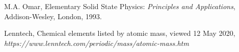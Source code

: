 \begin{thebibliography}{9}
    M.A. Omar, Elementary Solid State Physics:  
    \textit{Principles and Applications}, 
    Addison-Wesley, London, 1993.
    
    Lenntech, Chemical elements listed by atomic mass, viewed 12 May 2020,
    \textit{https://www.lenntech.com/periodic/mass/atomic-mass.htm}

\end{thebibliography}